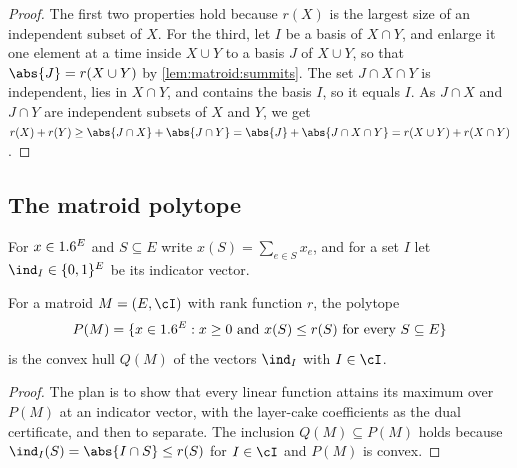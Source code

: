 \begin{refsection}

\begin{proof}
The first two properties hold because $r(X)$ is the largest size of an independent subset of $X$. For the third, let $I$ be a basis of $X\cap Y$, and enlarge it one element at a time inside $X\cup Y$ to a basis $J$ of $X\cup Y$, so that $\abs{J}=r(X\cup Y)$ by \cref{lem:matroid:summits}. The set $J\cap X\cap Y$ is independent, lies in $X\cap Y$, and contains the basis $I$, so it equals $I$. As $J\cap X$ and $J\cap Y$ are independent subsets of $X$ and $Y$, we get $r(X)+r(Y)\ge\abs{J\cap X}+\abs{J\cap Y}=\abs{J}+\abs{J\cap X\cap Y}=r(X\cup Y)+r(X\cap Y)$.
\end{proof}

\subsection{The matroid polytope}\label{sec:matroid:polytope}

For $x\in1.6^E$ and $S\subseteq E$ write $x(S)=\sum_{e\in S}x_e$, and for a set $I$ let $\ind_I\in\{0,1\}^E$ be its indicator vector.

\begin{theorem}\label{thm:matroid:polytope}
For a matroid $M=(E,\cI)$ with rank function $r$, the polytope
\[
P(M)=\{x\in1.6^E : x\ge0 \text{ and } x(S)\le r(S) \text{ for every } S\subseteq E\}
\]
is the convex hull $Q(M)$ of the vectors $\ind_I$ with $I\in\cI$.
\end{theorem}

\begin{proof}
The plan is to show that every linear function attains its maximum over $P(M)$ at an indicator vector, with the layer-cake coefficients as the dual certificate, and then to separate. The inclusion $Q(M)\subseteq P(M)$ holds because $\ind_I(S)=\abs{I\cap S}\le r(S)$ for $I\in\cI$ and $P(M)$ is convex.


\end{proof}
\end{refsection}
